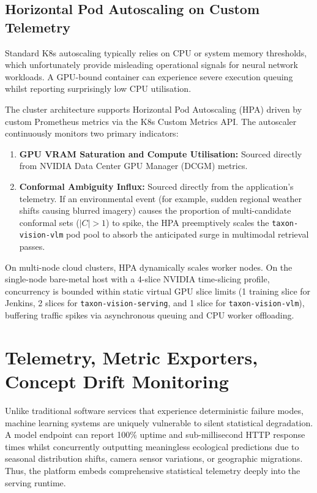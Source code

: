\subsection{Horizontal Pod Autoscaling on Custom Telemetry}
Standard K8s autoscaling typically relies on CPU or system memory thresholds, which unfortunately provide misleading operational signals for neural network workloads. A GPU-bound container can experience severe execution queuing whilst reporting surprisingly low CPU utilisation.

The cluster architecture supports Horizontal Pod Autoscaling (HPA) driven by custom Prometheus metrics via the K8s Custom Metrics API. The autoscaler continuously monitors two primary indicators:
\begin{enumerate}
    \item \textbf{GPU VRAM Saturation and Compute Utilisation:} Sourced directly from NVIDIA Data Center GPU Manager (DCGM) metrics.
    \item \textbf{Conformal Ambiguity Influx:} Sourced directly from the application's telemetry. If an environmental event (for example, sudden regional weather shifts causing blurred imagery) causes the proportion of multi-candidate conformal sets ($|C| > 1$) to spike, the HPA preemptively scales the \texttt{taxon-vision-vlm} pod pool to absorb the anticipated surge in multimodal retrieval passes.
\end{enumerate}
On multi-node cloud clusters, HPA dynamically scales worker nodes. On the single-node bare-metal host with a 4-slice NVIDIA time-slicing profile, concurrency is bounded within static virtual GPU slice limits (1 training slice for Jenkins, 2 slices for \texttt{taxon-vision-serving}, and 1 slice for \texttt{taxon-vision-vlm}), buffering traffic spikes via asynchronous queuing and CPU worker offloading.

\section{Telemetry, Metric Exporters, Concept Drift Monitoring}
\label{sec:observability_telemetry}

Unlike traditional software services that experience deterministic failure modes, machine learning systems are uniquely vulnerable to silent statistical degradation. A model endpoint can report 100\% uptime and sub-millisecond HTTP response times whilst concurrently outputting meaningless ecological predictions due to seasonal distribution shifts, camera sensor variations, or geographic migrations. Thus, the platform embeds comprehensive statistical telemetry deeply into the serving runtime.

